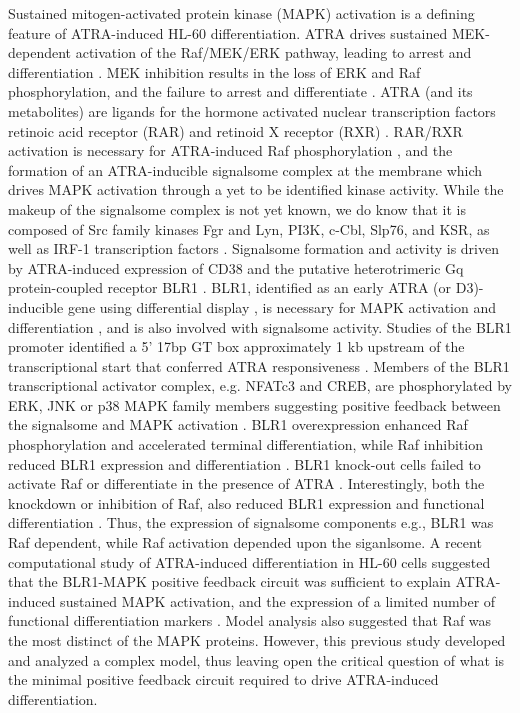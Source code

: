 \documentclass[12pt]{article}
\begin{document}
Sustained mitogen-activated protein kinase (MAPK) activation is a defining feature of ATRA-induced HL-60 differentiation.
ATRA drives sustained MEK-dependent activation of the Raf/MEK/ERK pathway, leading to arrest and differentiation \cite{Yen1998}.
MEK inhibition results in the loss of ERK and Raf phosphorylation, and the failure to arrest and differentiate \cite{Hong2001}.
ATRA (and its metabolites) are ligands for the hormone activated nuclear transcription factors retinoic acid receptor (RAR) and retinoid X receptor (RXR) \cite{Mangelsdorf1990}.
RAR/RXR activation is necessary for ATRA-induced Raf phosphorylation  \cite{Hong2001},
and the formation of an ATRA-inducible signalsome complex at the membrane which drives MAPK activation through a yet to be identified kinase activity.
While the makeup of the signalsome complex is not yet known,
we do know that it is composed of Src family kinases Fgr and Lyn, PI3K, c-Cbl, Slp76, and KSR, as well as IRF-1 transcription factors \cite{Congleton:2012fk,Shen:2011aa,Shen2009,Yen2006,Marchisio:1998aa}.
Signalsome formation and activity is driven by ATRA-induced expression of CD38 and the putative heterotrimeric Gq protein-coupled receptor BLR1 \cite{Congleton2011,WANG2004}.
BLR1, identified as an early ATRA (or D3)-inducible gene using differential display \cite{YEN1990},
is necessary for MAPK activation and differentiation \cite{WANG2004}, and is also involved with signalsome activity.
Studies of the BLR1 promoter identified a 5' 17bp GT box approximately 1 kb upstream of the transcriptional start that conferred ATRA responsiveness \cite{WANG2004}.
Members of the BLR1 transcriptional activator complex, e.g. NFATc3 and CREB,
are phosphorylated by ERK, JNK or p38 MAPK family members suggesting positive feedback between the signalsome and MAPK activation \cite{Yang2002}.
BLR1 overexpression enhanced Raf phosphorylation and accelerated terminal differentiation, while Raf inhibition reduced BLR1 expression and differentiation \cite{Wang2008}.
BLR1 knock-out cells failed to activate Raf or differentiate in the presence of ATRA \cite{Wang2008}.
Interestingly, both the knockdown or inhibition of Raf, also reduced BLR1 expression and functional differentiation \cite{Wang2008}.
Thus, the expression of signalsome components e.g., BLR1 was Raf dependent, while Raf activation depended upon the siganlsome.
A recent computational study of ATRA-induced differentiation in HL-60 cells suggested that the BLR1-MAPK positive feedback circuit was sufficient
to explain ATRA-induced sustained MAPK activation, and the expression of a limited number of functional differentiation markers \cite{Tasseff2011}.
Model analysis also suggested that Raf was the most distinct of the MAPK proteins.
However, this previous study developed and analyzed a complex model,
thus leaving open the critical question of what is the minimal positive feedback circuit required to drive ATRA-induced differentiation.
\end{document}

